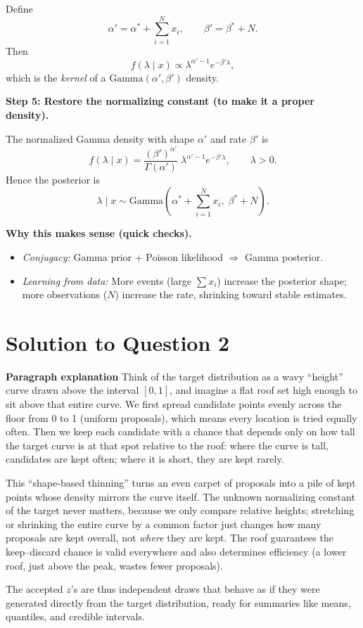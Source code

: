 \documentclass[12pt]{article}
\begin{document}
Define
\[
\alpha' = \alpha^* + \sum_{i=1}^N x_i,\qquad \beta' = \beta^* + N.
\]
Then
\[
f(\lambda \mid x) \propto \lambda^{\alpha'-1} e^{-\beta' \lambda},
\]
which is the \emph{kernel} of a $\text{Gamma}(\alpha',\beta')$ density.

\textbf{Step 5: Restore the normalizing constant (to make it a proper density).}

The normalized Gamma density with shape $\alpha'$ and rate $\beta'$ is
\[
f(\lambda \mid x)=\frac{(\beta')^{\alpha'}}{\Gamma(\alpha')}\;\lambda^{\alpha'-1} e^{-\beta'\lambda},\qquad \lambda>0.
\]
Hence the posterior is
\[
\boxed{\ \lambda \mid x \sim \text{Gamma}\!\left(\alpha^* + \sum_{i=1}^N x_i,\; \beta^* + N\right). \ }
\]

\textbf{Why this makes sense (quick checks).}
\begin{itemize}
\item \emph{Conjugacy:} Gamma prior + Poisson likelihood $\Rightarrow$ Gamma posterior.
\item \emph{Learning from data:} More events (large $\sum x_i$) increase the posterior shape; more observations ($N$) increase the rate, shrinking toward stable estimates.
\end{itemize}

\section*{Solution to Question 2}


\textbf{Paragraph explanation}  
Think of the target distribution as a wavy “height” curve drawn above the interval $[0,1]$, and imagine a flat roof set high enough to sit above that entire curve. We first spread candidate points evenly across the floor from 0 to 1 (uniform proposals), which means every location is tried equally often. Then we keep each candidate with a chance that depends only on how tall the target curve is at that spot relative to the roof: where the curve is tall, candidates are kept often; where it is short, they are kept rarely. 

This “shape-based thinning” turns an even carpet of proposals into a pile of kept points whose density mirrors the curve itself. The unknown normalizing constant of the target never matters, because we only compare relative heights; stretching or shrinking the entire curve by a common factor just changes how many proposals are kept overall, not \emph{where} they are kept. The roof guarantees the keep–discard chance is valid everywhere and also determines efficiency (a lower roof, just above the peak, wastes fewer proposals). 

The accepted $z$’s are thus independent draws that behave as if they were generated directly from the target distribution, ready for summaries like means, quantiles, and credible intervals.
\end{document}
